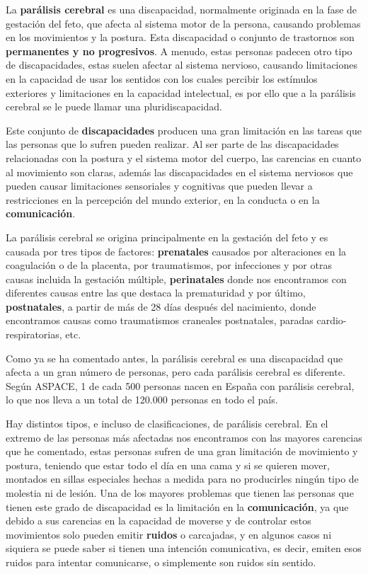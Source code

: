 
La \textbf{parálisis cerebral} es una discapacidad, normalmente originada en la fase de gestación del feto, que afecta al sistema motor de la persona, causando problemas en los movimientos y la postura. Esta discapacidad o conjunto de trastornos son \textbf{permanentes y no progresivos}. A menudo, estas personas padecen otro tipo de discapacidades, estas suelen afectar al sistema nervioso, causando limitaciones en la capacidad de usar los sentidos con los cuales percibir los estímulos exteriores y limitaciones en la capacidad intelectual, es por ello que a la parálisis cerebral se le puede llamar una pluridiscapacidad. \cite{aspacequees,aspacecyl,rosenbaum2007report}

Este conjunto de \textbf{discapacidades} producen una gran limitación en las tareas que las personas que lo sufren pueden realizar. Al ser parte de las discapacidades relacionadas con la postura y el sistema motor del cuerpo, las carencias en cuanto al movimiento son claras, además las discapacidades en el sistema nerviosos que pueden causar limitaciones sensoriales y cognitivas que pueden llevar a restricciones en la percepción del mundo exterior, en la conducta o en la \textbf{comunicación}.

La parálisis cerebral se origina principalmente en la gestación del feto y es causada por tres tipos de factores: \textbf{prenatales} causados por alteraciones en la coagulación o de la placenta, por traumatismos, por infecciones y por otras causas incluida la gestación múltiple, \textbf{perinatales} donde nos encontramos con diferentes causas entre las que destaca la prematuridad y por último, \textbf{postnatales}, a partir de más de 28 días después del nacimiento, donde encontramos causas como traumatismos craneales postnatales, paradas cardio-respiratorias, etc.\cite{crene,causas}

Como ya se ha comentado antes, la parálisis cerebral es una discapacidad que afecta a un gran número de personas, pero cada parálisis cerebral es diferente. Según ASPACE, 1 de cada 500 personas nacen en España con parálisis cerebral, lo que nos lleva a un total de 120.000 personas en todo el país.\cite{aspacedatos}

Hay distintos tipos, e incluso de clasificaciones, de parálisis cerebral. En el extremo de las personas más afectadas nos encontramos con las mayores carencias que he comentado, estas personas sufren de una gran limitación de movimiento y postura, teniendo que estar todo el día en una cama y si se quieren mover, montados en sillas especiales hechas a medida para no producirles ningún tipo de molestia ni de lesión. Una de los mayores problemas que tienen las personas que tienen este grado de discapacidad es la limitación en la \textbf{comunicación}, ya que debido a sus carencias en la capacidad de moverse y de controlar estos movimientos solo pueden emitir \textbf{ruidos} o carcajadas, y en algunos casos ni siquiera se puede saber si tienen una intención comunicativa, es decir, emiten esos ruidos para intentar comunicarse, o simplemente son ruidos sin sentido.

